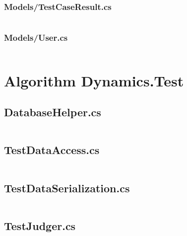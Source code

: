 \documentclass[a4paper]{report}
\begin{document}
\inputminted{csharp}{"../src/Algorithm Dynamics.Core/Models/TestCase.cs"}

\subsubsection{Models/TestCaseResult.cs}

\inputminted{csharp}{"../src/Algorithm Dynamics.Core/Models/TestCaseResult.cs"}

\subsubsection{Models/User.cs}

\inputminted{csharp}{"../src/Algorithm Dynamics.Core/Models/User.cs"}

\section{Algorithm Dynamics.Test}

\subsection{DatabaseHelper.cs}

\inputminted{csharp}{"../src/Algorithm Dynamics.Test/DatabaseHelper.cs"}

\subsection{TestDataAccess.cs}

\inputminted{csharp}{"../src/Algorithm Dynamics.Test/TestDataAccess.cs"}

\subsection{TestDataSerialization.cs}

\inputminted{csharp}{"../src/Algorithm Dynamics.Test/TestDataSerialization.cs"}

\subsection{TestJudger.cs}

\inputminted{csharp}{"../src/Algorithm Dynamics.Test/TestJudger.cs"}

\setcounter{biburlnumpenalty}{9000}
\setcounter{biburllcpenalty}{9000}
\setcounter{biburlucpenalty}{9000}

\printbibliography[
    heading=bibintoc,
    title={Bibliography}
]
\end{document}
